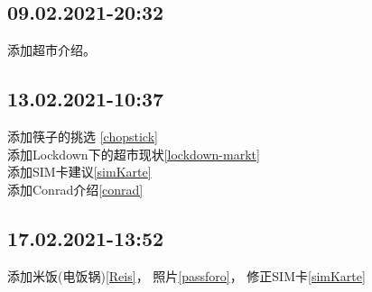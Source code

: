 \documentclass[doku	]{subfiles}
\begin{document}
	
	\subsection{09.02.2021-20:32} 添加超市介绍。
	\subsection{13.02.2021-10:37} 添加筷子的挑选 \ref{chopstick}\\
								  添加Lockdown下的超市现状\ref{lockdown-markt}\\
								  添加SIM卡建议\ref{simKarte}\\
								  添加Conrad介绍\ref{conrad}\\
								  
	\subsection{17.02.2021-13:52} 添加米饭(电饭锅)\ref{Reis}， 照片\ref{passforo}， 修正SIM卡\ref{simKarte}
								  
\end{document}
